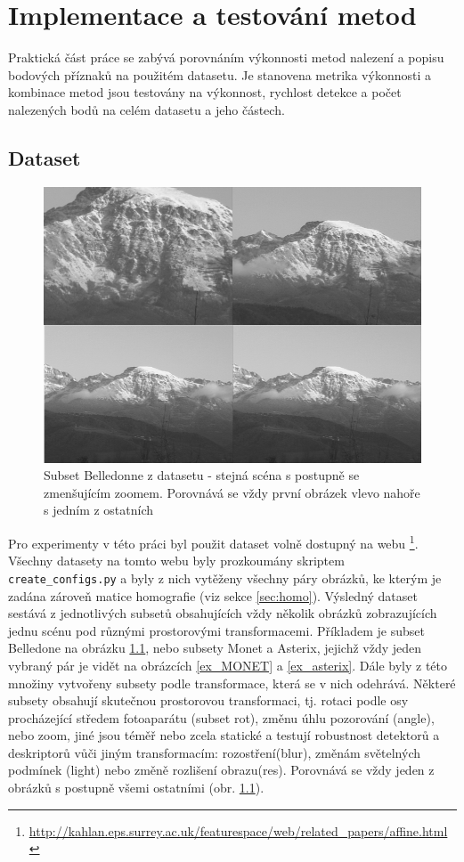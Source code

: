 
\chapter{Implementace a testování metod}
\label{chap:impl}

Praktická část práce se zabývá porovnáním výkonnosti metod nalezení a popisu bodových příznaků na použitém datasetu. Je stanovena metrika výkonnosti a kombinace metod jsou testovány na výkonnost, rychlost detekce a počet nalezených bodů na celém datasetu a jeho částech.

\section{Dataset}

\begin{figure}[!ht] 
	\centering
	\includegraphics[width=5in]{img/belledonne.png}
	\caption{Subset Belledonne z datasetu - stejná scéna s postupně se zmenšujícím zoomem. Porovnává se vždy první obrázek vlevo nahoře s jedním z ostatních } 	\label{dataset_belledonne}
\end{figure}

Pro experimenty v této práci byl použit dataset volně dostupný na webu \footnote{\url{http://kahlan.eps.surrey.ac.uk/featurespace/web/related_papers/affine.html}}. Všechny datasety na tomto webu byly prozkoumány skriptem \verb|create_configs.py| a byly z nich vytěženy všechny páry obrázků, ke kterým je zadána zároveň matice homografie (viz sekce \ref{sec:homo}). Výsledný dataset sestává z jednotlivých subsetů obsahujících vždy několik obrázků zobrazujících jednu scénu pod různými prostorovými transformacemi. Příkladem je subset Belledone na obrázku \ref{dataset_belledonne}, nebo subsety Monet a Asterix, jejichž vždy jeden vybraný pár je vidět na obrázcích \ref{ex_MONET} a \ref{ex_asterix}. Dále byly z této množiny vytvořeny subsety podle transformace, která se v nich odehrává. Některé subsety obsahují skutečnou prostorovou transformaci, tj. rotaci podle osy procházející středem fotoaparátu (subset rot), změnu úhlu pozorování (angle), nebo zoom, jiné jsou téměř nebo zcela statické a testují robustnost detektorů a deskriptorů vůči jiným transformacím: rozostření(blur), změnám světelných podmínek (light) nebo změně rozlišení obrazu(res). Porovnává se vždy jeden z obrázků s postupně všemi ostatními (obr. \ref{dataset_belledonne}). 

